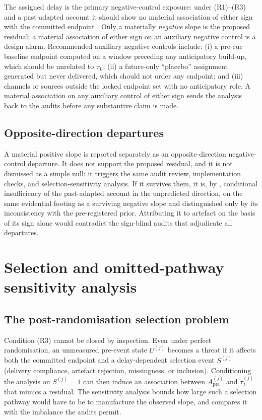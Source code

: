 \documentclass[11pt,a4paper]{article}
\theoremstyle{definition}
\newcommand{\Apre}{A_{\mathrm{pre}}}
\newcommand{\tauL}{\tau_L}
\begin{document}
The assigned delay is the primary negative-control exposure: under (R1)--(R3) and
a past-adapted account it should show no material association of either sign with
the committed endpoint \citep{Lipsitch2010,Shi2020}. Only a materially
\textit{negative} slope is the proposed residual; a material association of either
sign on an auxiliary negative control is a design alarm. Recommended auxiliary
negative controls include: (i) a pre-cue baseline endpoint computed on a window
preceding any anticipatory build-up, which should be unrelated to \(\tauL\); (ii)
a future-only ``placebo'' assignment generated but never delivered, which should
not order any endpoint; and (iii) channels or sources outside the locked endpoint
set with no anticipatory role. A material association on any auxiliary control of
either sign sends the analysis back to the audits before any substantive claim is
made.

\subsection{Opposite-direction departures}
\label{sec:si-opposite}

A material positive slope is reported separately as an opposite-direction
negative-control departure. It does not support the proposed residual, and it is
not dismissed as a simple null: it triggers the same audit review, implementation
checks, and selection-sensitivity analysis.
If it survives them, it is, by , conditional
insufficiency of the past-adapted account in the unpredicted direction, on the same
evidential footing as a surviving negative slope and distinguished only by its
inconsistency with the pre-registered prior. Attributing it to artefact on the
basis of its sign alone would contradict the sign-blind audits that adjudicate all
departures.

\section{Selection and omitted-pathway sensitivity analysis}
\label{sec:si-sensitivity-analysis}

\subsection{The post-randomisation selection problem}
\label{sec:si-selection-problem}

Condition (R3) cannot be closed by inspection. Even under perfect randomisation,
an unmeasured pre-event state \(U^{(j)}\) becomes a threat if it affects both the
committed endpoint and a delay-dependent selection event \(S^{(j)}\) (delivery
compliance, artefact rejection, missingness, or inclusion). Conditioning the
analysis on \(S^{(j)}=1\) can then induce an association between
\(\Apre^{(j)}\) and \(\tauL^{(j)}\) that mimics a residual. The sensitivity
analysis bounds how large such a selection pathway would have to be to manufacture
the observed slope, and compares it with the imbalance the audits permit.
\end{document}
